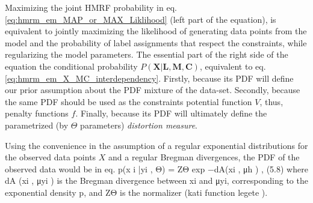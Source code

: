 \documentclass[dvips,dvipdfm,pdftex]{llncs}
\begin{document}
Maximizing the joint HMRF probability in eq.\ref{eq:hmrm_em_MAP_or_MAX_Liklihood} (left part of the equation), is equivalent to jointly maximizing the likelihood of generating data points from the model and the probability of label assignments that respect the constraints, while regularizing the model parameters. The essential part of the right side of the equation the conditional probability $P(\mathbf{X}|\mathbf{L},\mathbf{M},\mathbf{C})$, equivalent to eq.\ref{eq:hmrm_em_X_MC_interdependency}. Firstly, because its PDF will define our prior assumption about the PDF mixture of the data-set. Secondly, because the same PDF should be used as the constraints potential function $V$, thus, penalty functions $f$. Finally, because its PDF will ultimately define the parametrized (by $\Theta$ parameters) \emph{distortion measure}.

Using the convenience in the assumption of a regular exponential distributions for the observed data points $X$ and a regular Bregman divergences, the PDF of the observed data would be in eq.
p(x i |yi , Θ) =
 ZΘ
 exp −dA(xi , μh ) ,
 (5.8)
where dA (xi , μyi ) is the Bregman divergence between xi and μyi, corresponding to the exponential density p, and ZΘ is the normalizer (kati function legete ).




\end{document}
